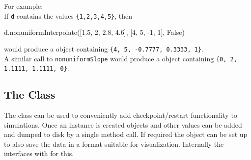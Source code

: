 \noindent For example:\\
If \texttt{d} contains the values \texttt{\{1,2,3,4,5\}}, then
\begin{python}
d.nonuniformInterpolate([1.5, 2, 2.8, 4.6], [4, 5, -1, 1], False)
\end{python}
would produce a \Data object containing \texttt{\{4, 5, -0.7777, 0.3333, 1\}}.\\
A similar call to \texttt{nonuniformSlope} would produce a \Data object containing \texttt{\{0, 2, 1.1111, 1.1111, 0\}}.
% 
% 
% 
% 
% 
% 

\subsection{The  Class}
\label{sec:datamanager}

The  class can be used to conveniently add checkpoint/restart
functionality to \escript simulations.
Once an instance is created \Data objects and other values can be added and
dumped to disk by a single method call.
If required the object can be set up to also save the data in a format suitable
for visualization.
Internally the  interfaces with \weipa for this.

